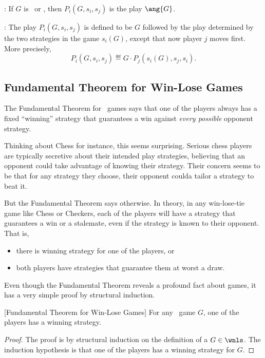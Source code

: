 \begin{definition}
\begin{staffnotes}
\begin{definition*}
: If $G$ is \winend\ or \loseend, then
$P_i(G,s_i,s_j)$ is the play $\ang{G}$.

: The play $P_i(G,s_i,s_j)$ is defined
to be $G$ followed by the play determined by the two strategies in the
game $s_i(G)$, except that now player $j$ moves first.  More
precisely,
\[
P_i(G,s_i,s_j) \eqdef G \cdot P_j(s_i(G),s_j,s_i).
\]
\end{definition*}
\end{staffnotes}

\subsection{Fundamental Theorem for Win-Lose Games}\label{FundThm_Games}

The Fundamental Theorem for \wnls\ games says that one of the players
always has a fixed ``winning'' strategy that guarantees a win against
\emph{every possible} opponent strategy.

Thinking about Chess for instance, this seems surprising.  Serious
chess players are typically secretive about their intended play
strategies, believing that an opponent could take advantage of knowing
their strategy.  Their concern seems to be that for any strategy they
choose, their opponent coulda tailor a strategy to beat it.

But the Fundamental Theorem says otherwise.  In theory, in any
win-lose-tie game like Chess or Checkers, each of the players will
have a strategy that guarantees a win or a stalemate, even if the
strategy is known to their opponent.  That is,
\begin{itemize}
\item there is winning strategy for one of the players, or
\item both players have strategies that guarantee them at worst a draw.
\end{itemize}

Even though the Fundamental Theorem reveals a profound fact about
games, it has a very simple proof by structural induction.

\begin{theorem}\label{fundgames}[Fundamental Theorem for Win-Lose Games]
For any \wnls\ game $G$, one of the players has a winning strategy.
\end{theorem}

\begin{proof}
The proof is by structural induction on the definition of a $G \in
\wnls$.  The induction hypothesis is that one of the players has a
winning strategy for $G$.


\end{proof}
\end{definition}
